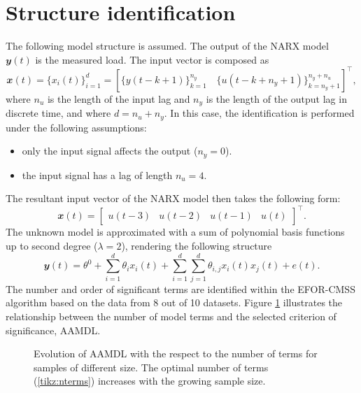 \documentclass[a4paper,11pt,twoside]{article}
\theoremstyle{mytheoremstyle}
\begin{document}
\section{Structure identification}
\par The following model structure is assumed. The output of the NARX model $\mathbfit{y}(t)$ is the measured load. The input vector is composed as
\begin{equation}
	\mathbfit{x}(t) = \{x_i(t)\}^{d}_{i=1} = \left[\{y(t - k + 1)\}^{n_y}_{k=1} \quad \{u(t - k + n_y + 1)\}^{n_y + n_u}_{k= n_y + 1} \right]^{\top},
\end{equation}
where $n_u$ is the length of the input lag and $n_y$ is the length of the output lag in discrete time, and where $d = n_u + n_y$. In this case, the identification is performed under the following assumptions:
\begin{itemize}[noitemsep,topsep=0.3pt,parsep=0.3pt,partopsep=0.2pt,labelindent=1cm] 
	\item only the input signal affects the output ($n_y = 0$).
	\item the input signal has a lag of length $n_u = 4$.
\end{itemize}
The resultant input vector of the NARX model then takes the following form:
\begin{equation}
\mathbfit{x}(t) = \left[\begin{array}{cccc}
u(t-3) & u(t-2) & u(t-1) & u(t)
\end{array}\right]^{\top}.
\end{equation}
The unknown model is approximated with a sum of polynomial basis functions up to second degree ($\lambda = 2$), rendering the following structure
\begin{equation}\label{eq:narx}
	\mathbfit{y}(t) = \theta^0 + \sum_{i=1}^{d} \theta_i x_i(t) + \sum_{i=1}^{d} \sum_{j=1}^{d} \theta_{i,j} x_i(t) x_j(t) + e(t).
\end{equation}
The number and order of significant terms are identified within the EFOR-CMSS algorithm based on the data from 8 out of 10 datasets. Figure \ref{fig:aamdl} illustrates the relationship between the number of model terms and the selected criterion of significance, AAMDL.
\begin{figure}[!h]
	\centering
	\caption{Evolution of AAMDL with the respect to the number of terms for samples of different size. The optimal number of terms (\ref{tikz:nterms}) increases with the growing sample size.}\label{fig:aamdl}
\end{figure}	
\end{document}
